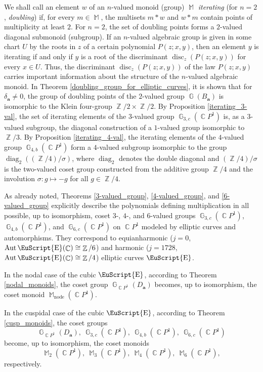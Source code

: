 \documentclass[14pt, dvipsnames]{extarticle}
\theoremstyle{plain}
\theoremstyle{definition}
\theoremstyle{remark}
\DeclareMathOperator{\disc}{\mathrm{disc}}
\DeclareMathOperator{\E}{\EuScript{E}}
\DeclareMathOperator{\G}{\mathbb{G}}
\DeclareMathOperator{\Aut}{\mathrm{Aut}}
\DeclareMathOperator{\Z}{\mathbb{Z}}
\DeclareMathOperator{\Cc}{\mathbb{C}}
\DeclareMathOperator{\diag}{\mathrm{diag}}
\DeclareMathOperator{\M}{\mathbb{M}}
\DeclareMathOperator{\node}{\mathrm{node}}
\begin{document}
We shall call an element $w$ of an $n$-valued monoid (group) $\M$ {\it iterating} (for $n = 2$, {\it doubling}) if, for every $m\in\M$, the multisets $m\ast w$ and $w\ast m$ contain points of multiplicity at least $2$. For $n = 2$, the set of doubling points forms a $2$-valued diagonal submonoid (subgroup). If an $n$-valued algebraic group is given in some chart $U$ by the roots in $z$ of a certain polynomial $P(z; x, y)$, then an element $y$ is iterating if and only if $y$ is a root of the discriminant $\disc_z(P(z; x, y))$ for every $x\in U$. Thus, the discriminant $\disc_z(P(z; x, y))$ of the law $P(z; x, y)$ carries important information about the structure of the $n$-valued algebraic monoid. In Theorem \ref{doubling_group_for_elliptic_curves}, it is shown that for $\delta_{\boldsymbol{a}}\neq 0$, the group of doubling points of the $2$-valued group $\G(B_{\boldsymbol{a}})$ is isomorphic to the Klein four-group $\Z/2\times\Z/2$. {By Proposition \ref{iterating_3-val}, the set of iterating elements of the $3$-valued group $\G_{3, c}(\Cc\!P^1)$ is, as a $3$-valued subgroup, the diagonal construction of a $1$-valued group isomorphic to $\Z/3$. By Proposition \ref{iterating_4-val}, the iterating elements of the $4$-valued group $\G_{4, b}(\Cc\!P^1)$ form a $4$-valued subgroup isomorphic to the group $\diag_2((\Z/4)/{\sigma})$, where $\diag_2$ denotes the double diagonal and $(\Z/4)/{\sigma}$ is the two-valued coset group constructed from the additive group $\Z/4$ and the involution $\sigma:g\mapsto -g$ for all $g\in\Z/4$.}


As already noted, Theorems \ref{3-valued_group}, \ref{4-valued_group}, and \ref{6-valued_group} explicitly describe the polynomials defining multiplication in all possible, up to isomorphism, coset $3$-, $4$-, and $6$-valued groups $\G_{3, c}(\Cc\!P^1)$, $\G_{4, b}(\Cc\!P^1)$, and $\G_{6, c}(\Cc\!P^1)$ on $\Cc\!P^1$ modeled by elliptic curves and automorphisms. They correspond to equianharmonic ($j = 0$, $\Aut \E(\Cc) \cong \Z/6$) and harmonic ($j = 1728$, $\Aut \E(\Cc)\cong \Z/4$) elliptic curves $\E$. 

In the nodal case of the cubic $\E$, according to Theorem \ref{nodal_monoids}, the coset group $\G_{\Cc\!P^1}(D_{\boldsymbol{a}})$ becomes, up to isomorphism, the coset monoid $\M_{\node}(\Cc\!P^1)$.

In the cuspidal case of the cubic $\E$, according to Theorem \ref{cusp_monoids}, the coset groups
$$\G_{\Cc\!P^1}(D_{\boldsymbol{a}}),\ \G_{3,c}(\Cc\!P^1),\ \G_{4, b}(\Cc\!P^1),\ \G_{6, c}(\Cc\!P^1)$$
become, up to isomorphism, the coset monoids
$$\M_2(\Cc\!P^1),\ \M_3(\Cc\!P^1),\ \M_4(\Cc\!P^1),\ \M_6(\Cc\!P^1),$$
respectively.
\end{document}
